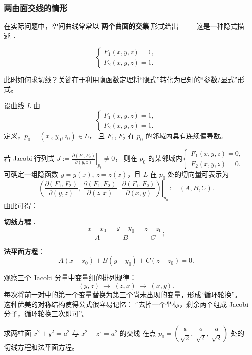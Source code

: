 \documentclass[lang=cn,11pt]{elegantbook}
\begin{document}
\subsubsection*{两曲面交线的情形}

在实际问题中，空间曲线常常以 \textbf{两个曲面的交集} 形式给出 ——
这是一种隐式描述：

\begin{equation}
\begin{cases}
F_1(x,y,z)=0,\\
F_2(x,y,z)=0.
\end{cases}
\end{equation}

此时如何求切线？关键在于利用隐函数定理将“隐式”转化为已知的“参数/显式”形式。

\begin{proposition} \label{prop:intersection-curve-tangent}
设曲线 $L$ 由\[\begin{cases}
F_1(x,y,z)=0,\\
F_2(x,y,z)=0.
\end{cases}\] 定义，$p_0=(x_0,y_0,z_0)\in L$，
且 $F_1$, $F_2$ 在 $p_0$ 的邻域内具有连续偏导数。

若 Jacobi 行列式 $\displaystyle J:=\left.\frac{\partial(F_1,F_2)}{\partial(y,z)}\right|_{p_0} \neq 0$，
则在 $p_0$ 的某邻域内$\begin{cases}F_1(x,y,z)=0,\\F_2(x,y,z)=0.\end{cases}$可确定一组隐函数 $y=y(x)$, $z=z(x)$，且 $L$ 在 $p_0$ 处的切向量可表示为
\[
\boxed{
\left.\left(
\frac{\partial(F_1,F_2)}{\partial(y,z)},\;
\frac{\partial(F_1,F_2)}{\partial(z,x)},\;
\frac{\partial(F_1,F_2)}{\partial(x,y)}
\right)\right|_{p_0}
:= (A,B,C)}.
\]
由此可得：

\textbf{切线方程}：
\[
\frac{x-x_0}{A}=\frac{y-y_0}{B}=\frac{z-z_0}{C};
\]

\textbf{法平面方程}：
\[
A(x-x_0)+B(y-y_0)+C(z-z_0)=0.
\]
\end{proposition}

\begin{note}
观察三个 Jacobi 分量中变量组的排列规律：
\[(y,z)\;\longrightarrow\;(z,x)\;\longrightarrow\;(x,y).\]
每次将前一对中的第一个变量替换为第三个尚未出现的变量，形成“循环轮换”。
这种优美的对称结构使得公式很容易记忆：
“去掉一个坐标，剩余两个组成 Jacobi 分子，循环轮换三次即可”。
\end{note}

\begin{example}[两柱面交线的切线与法平面] \label{ex:cylinder-intersection}
求两柱面 $x^2+y^2=a^2$ 与 $x^2+z^2=a^2$ 的交线
在点 $p_0=\left(\dfrac{a}{\sqrt{2}},\,\dfrac{a}{\sqrt{2}},\,\dfrac{a}{\sqrt{2}}\right)$
处的切线方程和法平面方程。
\end{example}
\end{document}

